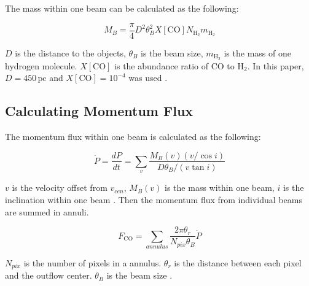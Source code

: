 The mass within one beam can be calculated as the following:

\begin{equation}
M_B =  \frac{\pi}{4} D^2 \theta_B ^2 X[\textrm{CO}] N_{\textrm{H}_2} m_{\textrm{H}_2}
\end{equation}

$D$ is the distance to the objects, $\theta_B$ is the beam size, $m_{\textrm{H}_2}$ is the mass of one hydrogen molecule. $X[\textrm{CO}]$ is the abundance ratio of CO to $\textrm{H}_2$. In this paper, $D = 450\,\textrm{pc}$ and $X[\textrm{CO}] = 10^{-4}$ was used \cite{hatchell2007star}.\\

\subsection{Calculating Momentum Flux}

The momentum flux within one beam is calculated as the following:

\begin{equation}
\dot{P} = \frac{dP}{dt} = \sum_{v} {\frac{M_B (v) (v/ \cos i)}{D\theta_B / (v \tan i)}}
\end{equation}

$v$ is the velocity offset from $v_{cen}$, $M_B (v)$ is the mass within one beam, $i$ is the inclination within one beam \cite{hatchell2007star}.
Then the momentum flux from individual beams are summed in annuli. 

\begin{equation}
F_{\textrm{CO}} = \sum _{annulus} \frac{2\pi \theta_r}{N_{pix}\theta_B}\dot{P}	
\end{equation}

$N_{pix}$ is the number of pixels in a annulus. $\theta_r$ is the distance between each pixel and the outflow center. $\theta_B$ is the beam size \cite{hatchell2007star, van2013outflow}.
